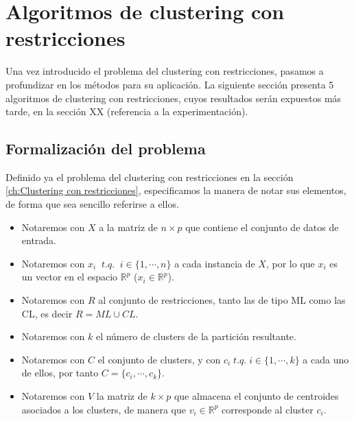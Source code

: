 \chapter{Algoritmos de clustering con restricciones}\label{ch:Algoritmos de clustering con restricciones}

Una vez introducido el problema del clustering con restricciones, pasamos a profundizar en los métodos para su aplicación. La siguiente sección presenta 5 algoritmos de clustering con restricciones, cuyos resultados serán expuestos más tarde, en la sección XX (referencia a la experimentación).

\section{Formalización del problema}

Definido ya el problema del clustering con restricciones en la sección \ref{ch:Clustering con restricciones}, especificamos la manera de notar sus elementos, de forma que sea sencillo referirse a ellos.

\begin{itemize}
	
	\item Notaremos con $X$ a la matriz de $n\times p$ que contiene el conjunto de datos de entrada.
	
	\item Notaremos con $x_i \;\; t.q. \;\; i \in \{1, \cdots, n\}$ a cada instancia de $X$, por lo que $x_i$ es un vector en el espacio $\mathbb{R}^p$ ($x_i \in \mathbb{R}^p$).
	
	\item Notaremos con $R$ al conjunto de restricciones, tanto las de tipo \acs{ML} como las \acs{CL}, es decir $R = ML \cup CL$. 
	
	\item Notaremos con $k$ el número de clusters de la partición resultante.
	
	\item Notaremos con $C$ el conjunto de clusters, y con $c_i \; t.q. \; i \in \{1, \cdots, k\}$ a cada uno de ellos, por tanto $C = \{c_i, \cdots, c_k\}$.
	
	\item Notaremos con $V$ la matriz de $k\times p$ que almacena el conjunto de centroides asociados a los clusters, de manera que $v_i \in \mathbb{R}^p$ corresponde al cluster $c_i$.
	
\end{itemize}

